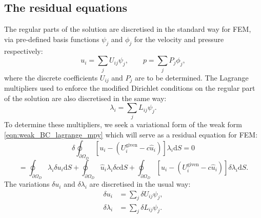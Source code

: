 \documentclass[12pt,a4paper]{article}
\numberwithin{equation}{section}
\newcommand{\D}{\mathrm{d}}
\begin{document}
\subsection{The residual equations}
The regular parts of the solution are discretised in the standard way for FEM, via pre-defined basis functions $\psi_j$ and $\phi_j$ for the velocity and pressure respectively:
\begin{equation}
  u_i = \sum_j U_{ij}\psi_j, \quad\quad p = \sum_j P_j \phi_j,
\end{equation}
where the discrete coefficients $U_{ij}$ and $P_j$ are to be determined. The Lagrange multipliers used to enforce the modified Dirichlet conditions on the regular part of the solution are also discretised in the same way:
\begin{equation}
  \lambda_i = \sum_j L_{ij}\psi_j.
\end{equation}
To determine these multipliers, we seek a variational form of the weak form \eqref{eqn:weak_BC_lagrange_mpy} which will serve as a residual equation for FEM:
\begin{equation}
  \delta   \oint_{\partial\Omega_D}\left[u_i - (U_i^{\text{given}}-c\hat u_i)\right]\lambda_i \D S = 0  
\end{equation}
\begin{equation}
  = \oint_{\partial\Omega_D} \lambda_i\delta u_i\D S + \oint_{\partial\Omega_D}\hat u_i\lambda_i\delta c\D S +
  \oint_{\partial\Omega_D}\left[u_i - (U_i^{\text{given}}-c\hat u_i)\right]\delta\lambda_i \D S.
  \label{eqn:lagrange_mpy_variational}
\end{equation}
The variations $\delta u_i$ and $\delta \lambda_i$ are discretised in the usual way:
\begin{align}
  \delta u_i &= \sum_j \delta U_{ij}\psi_j, \\
    \delta \lambda_i &= \sum_j \delta L_{ij}\psi_j.
\end{align}
\end{document}

